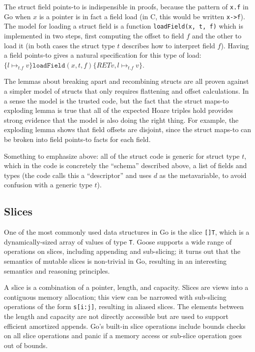 The struct field points-to is indispensible in proofs, because the
pattern of \texttt{x.f} in Go when \(x\) is a pointer is in fact a field
load (in C, this would be written \texttt{x-\textgreater{}f}). The model
for loading a struct field is a function \texttt{loadField(x,\ t,\ f)}
which is implemented in two steps, first computing the offset to field
\(f\) and the other to load it (in both cases the struct type \(t\)
describes how to interpret field \(f\)). Having a field points-to gives
a natural specification for this type of load:
\(\{ l \mapsto_{t.f} v \} \mathtt{loadField}(x, t, f) \{ RET v, l \mapsto_{t.f} v\}\).

The lemmas about breaking apart and recombining structs are all proven
against a simpler model of structs that only requires flattening and
offset calculations. In a sense the model is the trusted code, but the
fact that the struct maps-to exploding lemma is true that all of the
expected Hoare triples hold provides strong evidence that the model is
also doing the right thing. For example, the exploding lemma shows that
field offsets are disjoint, since the struct maps-to can be broken into
field points-to facts for each field.

Something to emphasize above: all of the struct code is generic for
struct type \(t\), which in the code is concretely the ``schema''
described above, a list of fields and types (the code calls this a
``descriptor'' and uses \(d\) as the metavariable, to avoid confusion
with a generic type \(t\)).

\hypertarget{slices}{%
\subsection{Slices}\label{slices}}

One of the most commonly used data structures in Go is the slice
\texttt{{[}{]}T}, which is a dynamically-sized array of values of type
\texttt{T}. Goose supports a wide range of operations on slices,
including appending and sub-slicing; it turns out that the semantics of
mutable slices is non-trivial in Go, resulting in an interesting
semantics and reasoning principles.

A slice is a combination of a pointer, length, and capacity. Slices are
views into a contiguous memory allocation; this view can be narrowed
with sub-slicing operations of the form \texttt{s{[}i:j{]}}, resulting
in aliased slices. The elements between the length and capacity are not
directly accessible but are used to support efficient amortized appends.
Go's built-in slice operations include bounds checks on all slice
operations and panic if a memory access or sub-slice operation goes out
of bounds.


